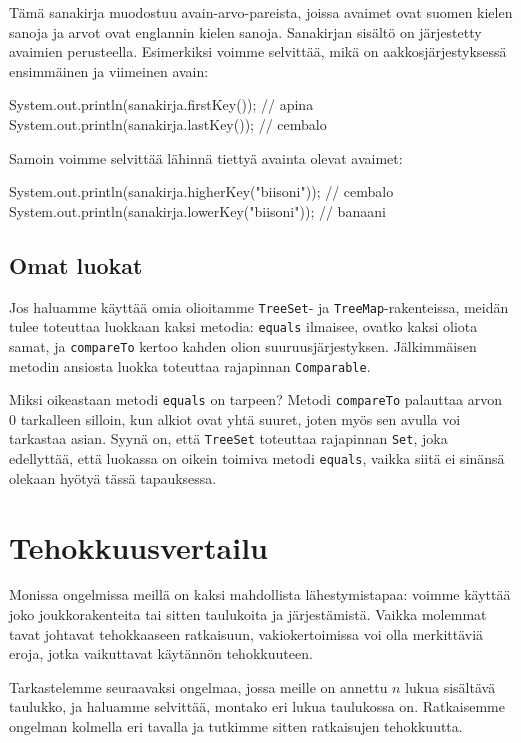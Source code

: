 Tämä sanakirja muodostuu avain-arvo-pareista,
joissa avaimet ovat suomen kielen sanoja
ja arvot ovat englannin kielen sanoja.
Sanakirjan sisältö on järjestetty avaimien perusteella.
Esimerkiksi voimme selvittää, mikä on aakkosjärjestyksessä
ensimmäinen ja viimeinen avain:

\begin{code}
System.out.println(sanakirja.firstKey()); // apina
System.out.println(sanakirja.lastKey()); // cembalo
\end{code}

Samoin voimme selvittää lähinnä tiettyä avainta olevat avaimet:

\begin{code}
System.out.println(sanakirja.higherKey("biisoni")); // cembalo
System.out.println(sanakirja.lowerKey("biisoni")); // banaani
\end{code}

\subsection{Omat luokat}

Jos haluamme käyttää omia olioitamme \texttt{TreeSet}- ja
\texttt{TreeMap}-rakenteissa, meidän tulee toteuttaa
luokkaan kaksi metodia:
\texttt{equals} ilmaisee, ovatko kaksi oliota samat,
ja \texttt{compareTo} kertoo kahden olion suuruusjärjestyksen.
Jälkimmäisen metodin ansiosta luokka toteuttaa rajapinnan
\texttt{Comparable}.

Miksi oikeastaan metodi \texttt{equals} on tarpeen?
Metodi \texttt{compareTo} palauttaa arvon 0 tarkalleen silloin,
kun alkiot ovat yhtä suuret, joten myös sen avulla voi
tarkastaa asian.
Syynä on, että \texttt{TreeSet} toteuttaa rajapinnan \texttt{Set},
joka edellyttää, että luokassa on oikein toimiva metodi \texttt{equals},
vaikka siitä ei sinänsä olekaan hyötyä tässä tapauksessa.

\section{Tehokkuusvertailu}

Monissa ongelmissa meillä on kaksi mahdollista lähestymistapaa:
voimme käyttää joko joukkorakenteita tai sitten taulukoita ja järjestämistä.
Vaikka molemmat tavat johtavat tehokkaaseen ratkaisuun,
vakiokertoimissa voi olla merkittäviä eroja, jotka vaikuttavat
käytännön tehokkuuteen.

Tarkastelemme seuraavaksi ongelmaa, jossa meille on annettu
$n$ lukua sisältävä taulukko, ja haluamme selvittää,
montako eri lukua taulukossa on.
Ratkaisemme ongelman kolmella eri tavalla ja tutkimme sitten
ratkaisujen tehokkuutta.

